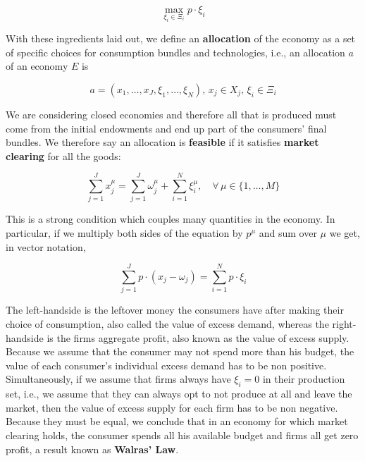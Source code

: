 \begin{equation}
  \label{eq:firm_obj}
  \max_{\xi_i \in \Xi_i} p \cdot \xi_i
\end{equation}

With these ingredients laid out, we define an \textbf{allocation} of the economy as a set of specific choices for consumption bundles and technologies, i.e., an allocation $a$ of an economy $E$ is

\begin{equation}
  \label{eq:GET_3}
  a = (x_1, \ldots, x_J, \xi_1, \ldots, \xi_N), \, x_j \in X_j, \,
  \xi_i \in \Xi_i
\end{equation}

We are considering closed economies and therefore all that is produced must come from the initial endowments and end up part of the consumers' final bundles. We therefore say an allocation is \textbf{feasible} if it satisfies \textbf{market clearing} for all the goods:

\begin{equation}
  \label{eq:GET_market_clearing}
  \sum_{j=1}^J x^\mu_j = \sum_{j=1}^J \omega_j^\mu + \sum_{i=1}^N
  \xi_i^\mu, \quad \forall \, \mu \in \{1,\ldots, M\}
\end{equation}

This is a strong condition which couples many quantities in the economy. In particular, if we multiply both sides of the equation by $p^\mu$ and sum over $\mu$ we get, in vector notation,

\begin{equation}
  \label{eq:GET_price_market_clearing}
  \sum_{j = 1}^J p \cdot (x_j - \omega_j) = \sum_{i=1}^N p\cdot \xi_i
\end{equation}

The left-handside is the leftover money the consumers have after making their choice of consumption, also called the value of excess demand, whereas the right-handside is the firms aggregate profit, also known as the value of excess supply. Because we assume that the consumer may not spend more than his budget, the value of each consumer's individual excess demand has to be non positive. Simultaneously, if we assume that firms always have $\xi_i = 0$ in their production set, i.e., we assume that they can always opt to not produce at all and leave the market, then the value of excess supply for each firm has to be non negative. Because they must be equal, we conclude that in an economy for which market clearing holds, the consumer spends all his available budget and firms all get zero profit, a result known as \textbf{Walras' Law}. 

